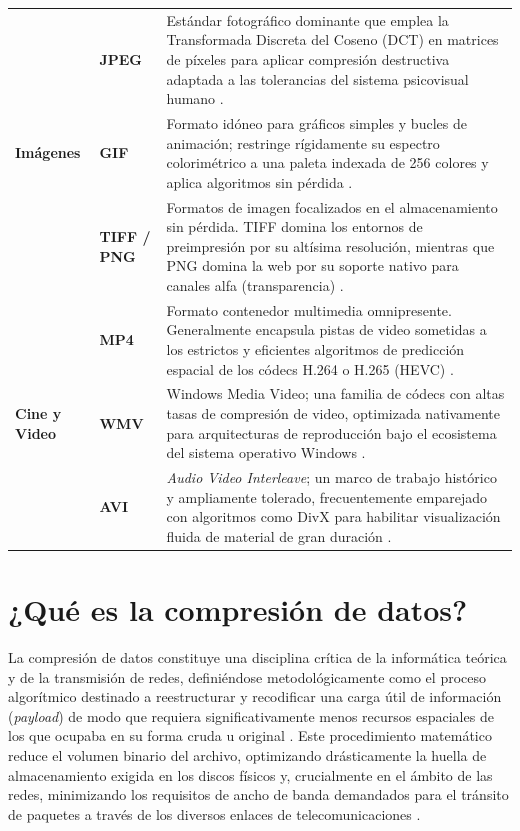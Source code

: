 \documentclass[a4paper,12pt]{article}
\begin{document}
\begin{table}[H]
{\begin{tabular}{@{}p{2.5cm}p{3cm}p{9.5cm}@{}}
\multirow{3}{*}{\textbf{Imágenes}} & \textbf{JPEG} & Estándar fotográfico dominante que emplea la Transformada Discreta del Coseno (DCT) en matrices de píxeles para aplicar compresión destructiva adaptada a las tolerancias del sistema psicovisual humano \cite{ionos_pres}. \\
 & \textbf{GIF} & Formato idóneo para gráficos simples y bucles de animación; restringe rígidamente su espectro colorimétrico a una paleta indexada de 256 colores y aplica algoritmos sin pérdida \cite{ionos_pres}. \\
 & \textbf{TIFF / PNG} & Formatos de imagen focalizados en el almacenamiento sin pérdida. TIFF domina los entornos de preimpresión por su altísima resolución, mientras que PNG domina la web por su soporte nativo para canales alfa (transparencia) \cite{ionos_pres}. \\ \midrule
\multirow{3}{*}{\textbf{Cine y Video}} & \textbf{MP4} & Formato contenedor multimedia omnipresente. Generalmente encapsula pistas de video sometidas a los estrictos y eficientes algoritmos de predicción espacial de los códecs H.264 o H.265 (HEVC) \cite{ms_video, lenovo_formats}. \\
 & \textbf{WMV} & Windows Media Video; una familia de códecs con altas tasas de compresión de video, optimizada nativamente para arquitecturas de reproducción bajo el ecosistema del sistema operativo Windows \cite{adpush_video, imagen_video}. \\
 & \textbf{AVI} & \textit{Audio Video Interleave}; un marco de trabajo histórico y ampliamente tolerado, frecuentemente emparejado con algoritmos como DivX para habilitar visualización fluida de material de gran duración \cite{lenovo_formats, adpush_video}. \\ \bottomrule
\end{tabular}%
}
\end{table}

\section{¿Qué es la compresión de datos?}

La compresión de datos constituye una disciplina crítica de la informática teórica y de la transmisión de redes, definiéndose metodológicamente como el proceso algorítmico destinado a reestructurar y recodificar una carga útil de información (\textit{payload}) de modo que requiera significativamente menos recursos espaciales de los que ocupaba en su forma cruda u original \cite{lenovo_comp, actian_comp}. Este procedimiento matemático reduce el volumen binario del archivo, optimizando drásticamente la huella de almacenamiento exigida en los discos físicos y, crucialmente en el ámbito de las redes, minimizando los requisitos de ancho de banda demandados para el tránsito de paquetes a través de los diversos enlaces de telecomunicaciones \cite{pure_comp}.
\end{document}
